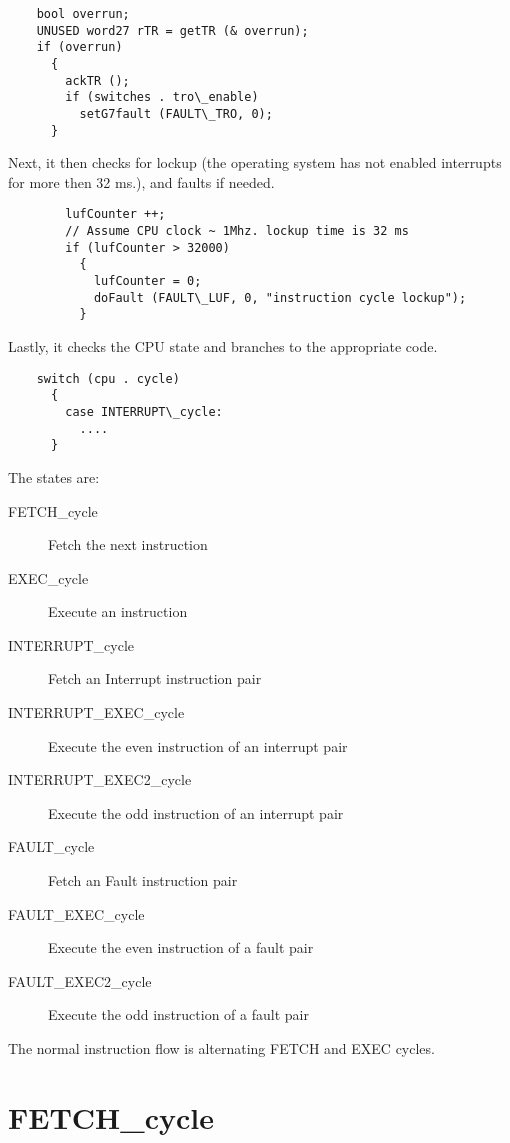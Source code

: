 \documentclass[notitlepage]{report}
\begin{document}
\begin{verbatim}
    bool overrun;
    UNUSED word27 rTR = getTR (& overrun);
    if (overrun)
      {
        ackTR ();
        if (switches . tro\_enable)
          setG7fault (FAULT\_TRO, 0);
      }
\end{verbatim}

Next, it then checks for lockup (the operating system has not enabled 
interrupts for more then 32 ms.), and faults if needed.

\begin{verbatim}
        lufCounter ++;
        // Assume CPU clock ~ 1Mhz. lockup time is 32 ms
        if (lufCounter > 32000)
          {
            lufCounter = 0;
            doFault (FAULT\_LUF, 0, "instruction cycle lockup");
          }
\end{verbatim}

Lastly, it checks the CPU state and branches to the appropriate code.

\begin{verbatim}
    switch (cpu . cycle)
      {
        case INTERRUPT\_cycle:
          ....
      }
\end{verbatim}

The states are:

\begin{description}
\item [FETCH\_cycle] Fetch the next instruction
\item [EXEC\_cycle] Execute an instruction
\item [INTERRUPT\_cycle] Fetch an Interrupt instruction pair
\item [INTERRUPT\_EXEC\_cycle] Execute the even instruction of an interrupt pair
\item [INTERRUPT\_EXEC2\_cycle] Execute the odd instruction of an interrupt pair
\item [FAULT\_cycle]Fetch an Fault instruction pair
\item [FAULT\_EXEC\_cycle] Execute the even instruction of a fault pair
\item [FAULT\_EXEC2\_cycle] Execute the odd instruction of a fault pair
\end{description}

The normal instruction flow is alternating FETCH and EXEC cycles.

\section{FETCH\_cycle}
\end{document}
